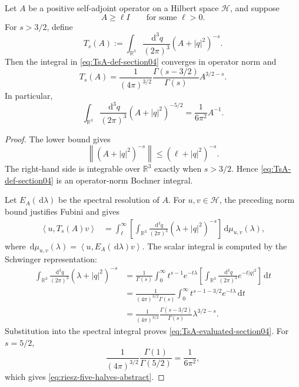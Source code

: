 \documentclass[11pt]{article}
\providecommand{\R}{\mathbb{R}}
\providecommand{\dd}{\,\mathrm{d}}
\providecommand{\abs}[1]{\left\lvert #1\right\rvert}
\providecommand{\norm}[1]{\left\lVert #1\right\rVert}
\providecommand{\inner}[2]{\left\langle #1,#2\right\rangle}
\numberwithin{equation}{section}
\begin{document}
\begin{lemma}
\label{lem:hilbert-space-riesz-integral}
Let \(A\) be a positive self-adjoint operator on a Hilbert space \(\mathcal H\),
and suppose
\[
    A\geq \ell I
    \qquad \text{for some }\ell>0 .
\]
For \(s>3/2\), define
\begin{equation}
    T_s(A)
    :=
    \int_{\R^3}\frac{\dd^3 q}{(2\pi)^3}
    (A+\abs{q}^2)^{-s} .
    \label{eq:TsA-def-section04}
\end{equation}
Then the integral in \eqref{eq:TsA-def-section04} converges in operator norm
and
\begin{equation}
    T_s(A)
    =
    \frac{1}{(4\pi)^{3/2}}
    \frac{\Gamma(s-3/2)}{\Gamma(s)}
    A^{3/2-s} .
    \label{eq:TsA-evaluated-section04}
\end{equation}
In particular,
\begin{equation}
    \int_{\R^3}\frac{\dd^3 q}{(2\pi)^3}
    (A+\abs{q}^2)^{-5/2}
    =
    \frac{1}{6\pi^2}A^{-1} .
    \label{eq:riesz-five-halves-abstract}
\end{equation}
\end{lemma}

\begin{proof}
The lower bound gives
\[
    \norm{(A+\abs{q}^2)^{-s}}
    \leq
    (\ell+\abs{q}^2)^{-s} .
\]
The right-hand side is integrable over \(\R^3\) exactly when \(s>3/2\).
Hence \eqref{eq:TsA-def-section04} is an operator-norm Bochner integral.

Let \(E_A(\dd\lambda)\) be the spectral resolution of \(A\).  For
\(u,v\in\mathcal H\), the preceding norm bound justifies Fubini and gives
\begin{align*}
    \inner{u}{T_s(A)v}
    &=
    \int_{\ell}^{\infty}
    \left[
        \int_{\R^3}\frac{\dd^3 q}{(2\pi)^3}
        (\lambda+\abs{q}^2)^{-s}
    \right]
    \dd\mu_{u,v}(\lambda),
\end{align*}
where \(\dd\mu_{u,v}(\lambda)=\inner{u}{E_A(\dd\lambda)v}\).  The scalar
integral is computed by the Schwinger representation:
\begin{align*}
    \int_{\R^3}\frac{\dd^3q}{(2\pi)^3}(\lambda+\abs{q}^2)^{-s}
    &=
    \frac{1}{\Gamma(s)}
    \int_0^\infty t^{s-1}e^{-t\lambda}
    \left[
        \int_{\R^3}\frac{\dd^3q}{(2\pi)^3}e^{-t\abs{q}^2}
    \right]\dd t                                                   \\
    &=
    \frac{1}{(4\pi)^{3/2}\Gamma(s)}
    \int_0^\infty t^{s-1-3/2}e^{-t\lambda}\dd t                  \\
    &=
    \frac{1}{(4\pi)^{3/2}}
    \frac{\Gamma(s-3/2)}{\Gamma(s)}
    \lambda^{3/2-s} .
\end{align*}
Substitution into the spectral integral proves
\eqref{eq:TsA-evaluated-section04}.  For \(s=5/2\),
\[
    \frac{1}{(4\pi)^{3/2}}\frac{\Gamma(1)}{\Gamma(5/2)}
    =
    \frac{1}{6\pi^2},
\]
which gives \eqref{eq:riesz-five-halves-abstract}.
\end{proof}
\end{document}
